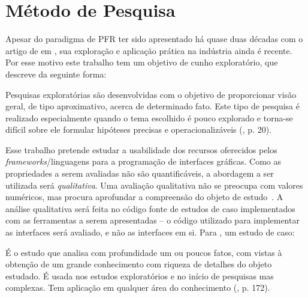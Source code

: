 \section{Método de Pesquisa}
\label{sec:metodo}

Apesar do paradigma de PFR ter sido apresentado há
quase duas décadas com o artigo de 
em \citeyear{Elliott-H:1997:Fran}, sua exploração e aplicação
prática na indústria ainda é recente.
Por esse motivo este trabalho tem um objetivo de
cunho exploratório, que 
descreve da seguinte forma:

\begin{citacao}
  Pesquisas exploratórias são desenvolvidas com o
  objetivo de proporcionar visão geral, de tipo aproximativo,
  acerca de determinado fato.
  Este tipo de pesquisa é realizado especialmente quando o
  tema escolhido é pouco explorado e torna-se difícil sobre
  ele formular hipóteses precisas e operacionalizáveis
  (\citeyear{gil2010metodos}, p. 20).
\end{citacao}

Esse trabalho pretende estudar a usabilidade dos recursos
oferecidos pelos \emph{frameworks}/linguagens para a
programação de interfaces gráficas.
Como as propriedades a serem avaliadas não são quantificáveis,
a abordagem a ser utilizada será \emph{qualitativa}.
Uma avaliação qualitativa não se
preocupa com valores numéricos, mas procura aprofundar
a compreensão do objeto de estudo~\cite[p.~31]{gerhardt2009metodos}.
A análise qualitativa será feita no código fonte de estudos de caso
implementados com as ferramentas a serem apresentadas
-- o código utilizado para implementar as interfaces será
avaliado, e não as interfaces em si.
Para , um estudo de caso:

\begin{citacao}
  É o estudo que analisa com profundidade um ou poucos fatos,
  com vistas à obtenção de um grande conhecimento com riqueza
  de detalhes do objeto estudado. É usada nos estudos exploratórios
  e no início de pesquisas mas complexas. Tem aplicação em
  qualquer área do conhecimento (\citeyear{gil2010metodos}, p. 172).
\end{citacao}

